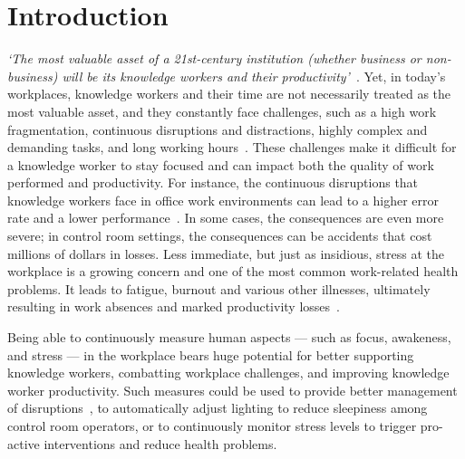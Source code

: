 \section{Introduction}
\textit{`The most valuable asset of a 21st-century institution (whether business or non-business) will be its knowledge workers and their productivity'}~\cite{drucker1999knowledge}. Yet, in today's workplaces, knowledge workers and their time are not necessarily treated as the most valuable asset, and they constantly face challenges, such as a high work fragmentation, continuous disruptions and distractions, highly complex and demanding tasks, and long working hours~\cite{gonzalez2004constant,mark2008cost,czerwinski04diary}. These challenges make it difficult for a knowledge worker to stay focused and can impact both the quality of work performed and productivity. For instance, the continuous disruptions that knowledge workers face in office work environments can lead to a higher error rate and a lower performance~\cite{bailey2001effects,mark2008cost}. In some cases,
the consequences are even more severe; in control room
settings, the consequences can be accidents that cost millions of dollars in losses. 
Less immediate, but just as insidious, stress at the workplace is a growing concern and one of the most common work-related health problems. It leads to fatigue, burnout and various other illnesses, ultimately resulting in work absences and marked productivity losses~\cite{hockey1997stress,setz2010stress,wrs2010}. 

Being able to continuously measure human aspects --- such as focus, awakeness, and stress --- in the workplace bears huge potential for better supporting knowledge workers, combatting workplace challenges, and improving knowledge worker productivity. Such measures could be used to provide better management of disruptions~\cite{iqbal2005effectiveness,zuger2017reducing}, to automatically adjust lighting to reduce sleepiness among control room operators, or to continuously monitor stress levels to trigger pro-active interventions and reduce health problems. 

